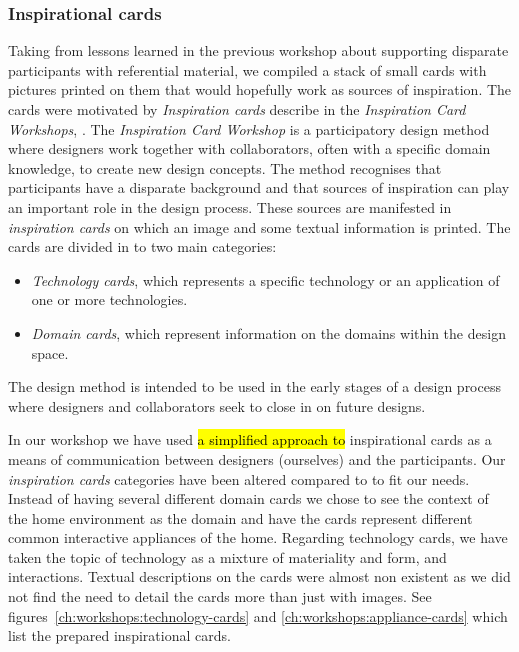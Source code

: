 \subsubsection{Inspirational cards}
\label{ch:workshops:workshop-ii:inspiration-cards}
Taking from lessons learned in the previous workshop about supporting disparate participants with referential material, we compiled a stack of small cards with pictures printed on them that would hopefully work as sources of inspiration.
The cards were motivated by \emph{Inspiration cards} describe in the \emph{Inspiration Card Workshops}, \citep{halskov2006inspiration}.
The \emph{Inspiration Card Workshop} is a participatory design method where designers work together with collaborators, often with a specific domain knowledge, to create new design concepts.
The method recognises that participants have a disparate background and that sources of inspiration can play an important role in the design process.
These sources are manifested in \emph{inspiration cards} on which an image and some textual information is printed.
The cards are divided in to two main categories:
\begin{itemize}
  \item{\emph{Technology cards}, which represents a specific technology or an application of one or more technologies.}
  \item{\emph{Domain cards}, which represent information on the domains within the design space.}
\end{itemize}


The design method is intended to be used in the early stages of a design process where designers and collaborators seek to close in on future designs.

In our workshop we have used \hl{a simplified approach to} inspirational cards as a means of communication between designers (ourselves) and the participants.
Our \emph{inspiration cards} categories have been altered compared to \citep{halskov2006inspiration} to fit our needs.
Instead of having several different domain cards we chose to see the context of the home environment as the domain and have the cards represent different common interactive appliances of the home.
Regarding technology cards, we have taken the topic of technology as a mixture of materiality and form, and interactions.
Textual descriptions on the cards were almost non existent as we did not find the need to detail the cards more than just with images.
See figures~\ref{ch:workshops:technology-cards} and \ref{ch:workshops:appliance-cards} which list the prepared inspirational cards.

